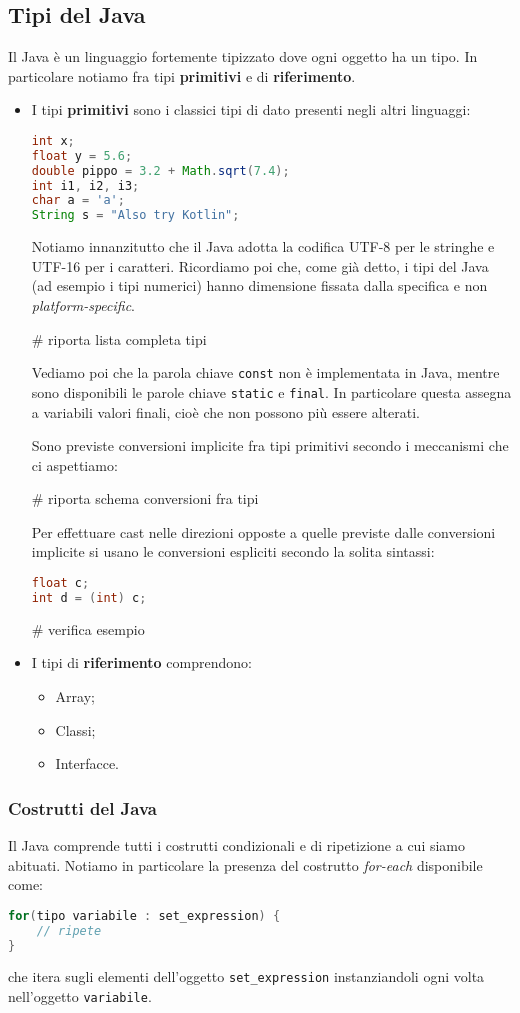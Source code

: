 \documentclass[a4paper,11pt]{article}
\begin{document}
\subsection{Tipi del Java}
Il Java è un linguaggio fortemente tipizzato dove ogni oggetto ha un tipo.
In particolare notiamo fra tipi \textbf{primitivi} e di \textbf{riferimento}.

\begin{itemize}
	\item I tipi \textbf{primitivi} sono i classici tipi di dato presenti negli altri linguaggi:
\begin{lstlisting}[language=java, style=codestyle]	
int x;
float y = 5.6;
double pippo = 3.2 + Math.sqrt(7.4);
int i1, i2, i3;
char a = 'a';
String s = "Also try Kotlin";
\end{lstlisting}
		Notiamo innanzitutto che il Java adotta la codifica UTF-8 per le stringhe e UTF-16 per i caratteri. Ricordiamo poi che, come già detto, i tipi del Java (ad esempio i tipi numerici) hanno dimensione fissata dalla specifica e non \textit{platform-specific}.

		# riporta lista completa tipi 

		Vediamo poi che la parola chiave \lstinline|const| non è implementata in Java, mentre sono disponibili le parole chiave \lstinline|static| e \lstinline|final|. In particolare questa assegna a variabili valori finali, cioè che non possono più essere alterati.

	Sono previste conversioni implicite fra tipi primitivi secondo i meccanismi che ci aspettiamo:

	# riporta schema conversioni fra tipi

	Per effettuare cast nelle direzioni opposte a quelle previste dalle conversioni implicite si usano le conversioni espliciti secondo la solita sintassi:
\begin{lstlisting}[language=java, style=codestyle]	
float c;
int d = (int) c;
\end{lstlisting} # verifica esempio
	\item I tipi di \textbf{riferimento} comprendono:
		\begin{itemize}
			\item Array;
			\item Classi;
			\item Interfacce.
		\end{itemize}
\end{itemize}

\subsubsection{Costrutti del Java}
Il Java comprende tutti i costrutti condizionali e di ripetizione a cui siamo abituati.
Notiamo in particolare la presenza del costrutto \textit{for-each} disponibile come:
\begin{lstlisting}[language=java, style=codestyle]	
for(tipo variabile : set_expression) {
	// ripete
}
\end{lstlisting}
che itera sugli elementi dell'oggetto \lstinline|set_expression| instanziandoli ogni volta nell'oggetto \lstinline|variabile|.
\end{document}
